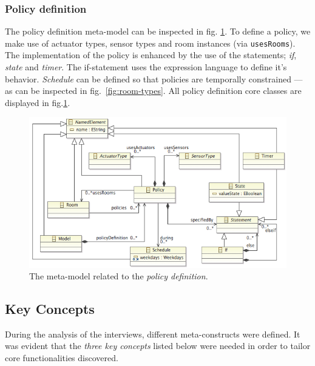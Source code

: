 \subsubsection{Policy definition}
The policy definition meta-model can be inspected in fig. \ref{fig:ecore-policy-definition}. To define a policy, we make use of actuator types, sensor types and room instances (via \texttt{usesRooms}). The implementation of the policy is enhanced by the use of the statements; \textit{if}, \textit{state} and \textit{timer}. The if-statement uses the expression language to define it's behavior. \textit{Schedule} can be defined so that policies are temporally constrained --- as can be inspected in fig.~\ref{fig:room-types}. All policy definition core classes are displayed in fig.\ref{fig:ecore-policy-definition}.
\begin{figure}[h]
  \centering
    \includegraphics[scale=.5]{ecore-policy-definition.png}	
	\caption{The meta-model related to the \textit{policy definition}.}
	\label{fig:ecore-policy-definition}
\end{figure}

\subsection{Key Concepts}
During the analysis of the interviews, different meta-constructs were defined. It was evident that the \textit{three key concepts} listed below were needed in order to tailor core functionalities discovered.

